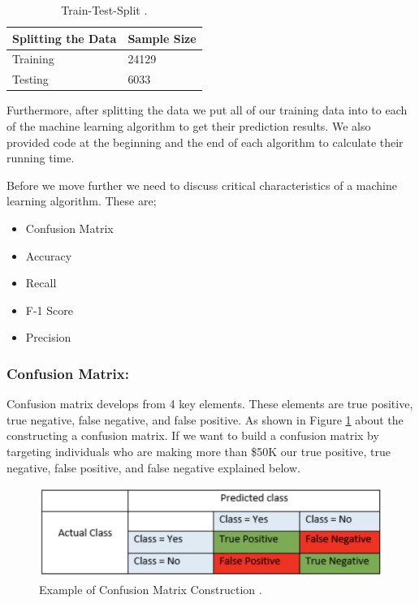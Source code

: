 \documentclass[sigconf]{acmart}
\begin{document}
\begin{table}[!ht]
\centering
\begin{tabular}{|l|l|}
\hline
\textbf{Splitting the Data} & \textbf{Sample Size} \\ \hline
Training                    & 24129                \\ \hline
Testing                     & 6033                 \\ \hline
\end{tabular}
\caption{Train-Test-Split \cite{Borga2017}.}
\label{split}
\end{table}

\par Furthermore, after splitting the data we put all of our training data into to each of the machine learning algorithm to get their prediction results. We also provided code at the beginning and the end of each algorithm to calculate their running time.

\par Before we move further we need to discuss critical characteristics of a machine learning algorithm. These are;

\begin{itemize}
    \item Confusion Matrix
    \item Accuracy
    \item Recall
    \item F-1 Score
    \item Precision 
\end{itemize}

\subsubsection{\textbf{Confusion Matrix:}}
Confusion matrix develops from 4 key elements. These elements are true positive, true negative, false negative, and false positive. As shown in Figure \ref{fig:confusion-matrix} about the constructing a confusion matrix. If we want to build a confusion matrix by targeting individuals who are making more than \$50K our true positive, true negative, false positive, and false negative explained below. 

\begin{figure}[!ht]
  \centering
      \includegraphics[width=\columnwidth]{images/confusion-matrix.png}
  \caption{Example of Confusion Matrix Construction \cite{www-exsilio}.}\label{fig:confusion-matrix}
\end{figure}
\end{document}
